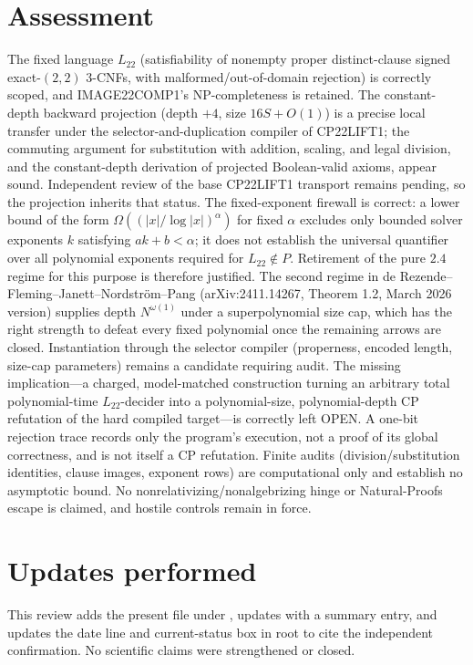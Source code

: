 \documentclass[11pt]{article}
\begin{document}
\section{Assessment}
The fixed language \(L_{22}\) (satisfiability of nonempty proper distinct-clause signed exact-\((2,2)\) 3-CNFs, with malformed/out-of-domain rejection) is correctly scoped, and IMAGE22COMP1's NP-completeness is retained.
The constant-depth backward projection (depth \(+4\), size \(16S+O(1)\)) is a precise local transfer under the selector-and-duplication compiler of CP22LIFT1; the commuting argument for substitution with addition, scaling, and legal division, and the constant-depth derivation of projected Boolean-valid axioms, appear sound.  Independent review of the base CP22LIFT1 transport remains pending, so the projection inherits that status.
The fixed-exponent firewall is correct: a lower bound of the form \(\Omega((|x|/\log|x|)^\alpha)\) for fixed \(\alpha\) excludes only bounded solver exponents \(k\) satisfying \(ak+b<\alpha\); it does not establish the universal quantifier over all polynomial exponents required for \(L_{22}\notin P\).  Retirement of the pure \(2.4\) regime for this purpose is therefore justified.
The second regime in de Rezende--Fleming--Janett--Nordstr\"om--Pang (arXiv:2411.14267, Theorem 1.2, March 2026 version) supplies depth \(N^{\omega(1)}\) under a superpolynomial size cap, which has the right strength to defeat every fixed polynomial once the remaining arrows are closed.  Instantiation through the selector compiler (properness, encoded length, size-cap parameters) remains a candidate requiring audit.
The missing implication---a charged, model-matched construction turning an arbitrary total polynomial-time \(L_{22}\)-decider into a polynomial-size, polynomial-depth CP refutation of the hard compiled target---is correctly left OPEN.  A one-bit rejection trace records only the program's execution, not a proof of its global correctness, and is not itself a CP refutation.  Finite audits (division/substitution identities, clause images, exponent rows) are computational only and establish no asymptotic bound.
No nonrelativizing/nonalgebrizing hinge or Natural-Proofs escape is claimed, and hostile controls remain in force.

\section{Updates performed}
This review adds the present file under , updates  with a summary entry, and updates the date line and current-status box in root  to cite the independent confirmation.  No scientific claims were strengthened or closed.
\end{document}
